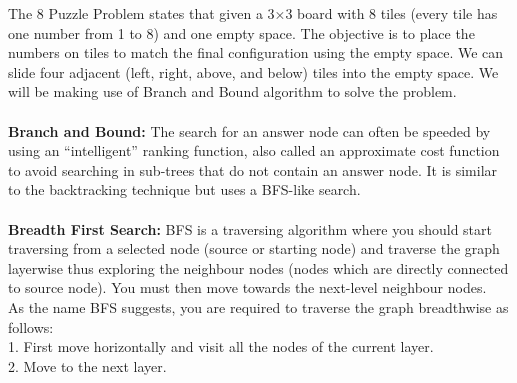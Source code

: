 The 8 Puzzle Problem states that given a 3×3 board with 8 tiles (every tile has one number from 1 to 8) and one empty space. The objective is to place the numbers on tiles to match the final configuration using the empty space. We can slide four adjacent (left, right, above, and below) tiles into the empty space. We will be making use of Branch and Bound algorithm to solve the problem.
\\
\\
\textbf{Branch and Bound: } The search for an answer node can often be speeded by using an “intelligent” ranking function, also called an approximate cost function to avoid searching in sub-trees that do not contain an answer node. It is similar to the backtracking technique but uses a BFS-like search.\\\\
\textbf{Breadth First Search: } BFS is a traversing algorithm where you should start traversing from a selected node (source or starting node) and traverse the graph layerwise thus exploring the neighbour nodes (nodes which are directly connected to source node). You must then move towards the next-level neighbour nodes.\\

As the name BFS suggests, you are required to traverse the graph breadthwise as follows:\\
1. First move horizontally and visit all the nodes of the current layer.\\
2. Move to the next layer.

